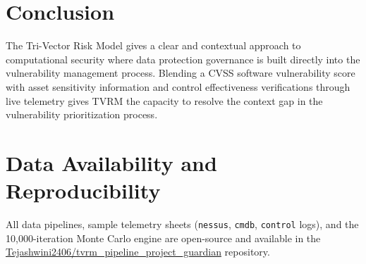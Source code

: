 \documentclass[conference,a4paper]{IEEEtran}
\begin{document}
\section{Conclusion}
The Tri-Vector Risk Model gives a clear and contextual approach to computational security where data protection governance is built directly into the vulnerability management process. Blending a CVSS software vulnerability score with asset sensitivity information and control effectiveness verifications through live telemetry gives TVRM the capacity to resolve the context gap in the vulnerability prioritization process.
\vspace{-3pt}
\section*{Data Availability and Reproducibility}
All data pipelines, sample telemetry sheets (\texttt{nessus}, \texttt{cmdb}, \texttt{control} logs), and the 10,000-iteration Monte Carlo engine are open-source and available in the \href{https://github.com/Tejashwini2406/tvrm_pipeline_project_guardian.git}{Tejashwini2406/tvrm\_pipeline\_project\_guardian} repository.
\end{document}

